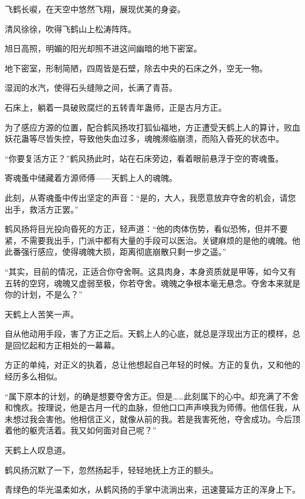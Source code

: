 
\begin{this_body}



飞鹤长唳，在天空中悠然飞翔，展现优美的身姿。

清风徐徐，吹得飞鹤山上松涛阵阵。

旭日高照，明媚的阳光却照不进这间幽暗的地下密室。

地下密室，形制简陋，四周皆是石壁，除去中央的石床之外，空无一物。

湿润的水汽，使得石头缝隙之间，长满了青苔。

石床上，躺着一具破败腐烂的五转青年蛊师，正是古月方正。

为了感应方源的位置，配合鹤风扬攻打狐仙福地，方正遭受天鹤上人的算计，败血妖花蛊等尽皆失控，导致他失血过多，魂魄濒临崩溃，而陷入昏死的状态中。

“你要复活方正？”鹤风扬此时，站在石床旁边，看着眼前悬浮于空的寄魂蚤。

寄魂蚤中储藏着方源师傅——天鹤上人的魂魄。

此刻，从寄魂蚤中传出坚定的声音：“是的，大人，我愿意放弃夺舍的机会，请您出手，救活方正罢。”

鹤风扬将目光投向昏死的方正，轻声道：“他的肉体伤势，看似恐怖，但并不要紧，不需要我出手，门派中都有大量的手段可以医治。关键麻烦的是他的魂魄。他此番强行感应，使得魂魄大损，距离彻底崩散只剩一步之遥。”

“其实，目前的情况，正适合你夺舍啊。这具肉身，本身资质就是甲等，如今又有五转的空窍，魂魄又虚弱至极，你若夺舍。魂魄之争根本毫无悬念。夺舍本来就是你的计划，不是么？”

天鹤上人苦笑一声。

自从他动用手段，害了方正之后。天鹤上人的心底，就总是浮现出方正的模样，总是回忆起和方正相处的一幕幕。

方正的单纯，对正义的执着，总让他想起自己年轻的时候。方正的复仇，又和他的经历多么相似。

“属下原本的计划，的确是想要夺舍方正。但是……此刻属下的心中。却充满了不舍和愧疚。按理说，他是古月一代的血脉，但他口口声声唤我为师傅。他信任我，从未想过我会害他。他相信正义，就像从前的我。若是我害死他，夺舍成功。今后顶着他的躯壳活着。我又如何面对自己呢？”

天鹤上人叹息道。

鹤风扬沉默了一下，忽然扬起手，轻轻地抚上方正的额头。

青绿色的华光温柔如水，从鹤风扬的手掌中流淌出来，迅速蔓延方正的浑身上下。


\end{this_body}
